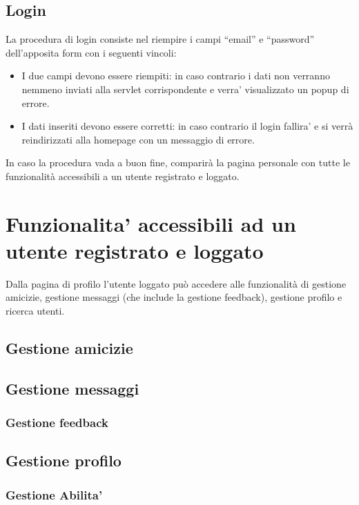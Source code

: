 \documentclass[a4paper,12pt]{article}
\begin{document}
\subsection{Login}
La procedura di login consiste nel riempire i campi ``email'' e ``password'' dell'apposita form con i seguenti vincoli:

\begin{itemize}
 \item I due campi devono essere riempiti: in caso contrario i dati non verranno nemmeno inviati alla servlet corrispondente e verra' visualizzato un popup di errore.
 \item I dati inseriti devono essere corretti: in caso contrario il login fallira' e si verrà reindirizzati alla homepage con un messaggio di errore.
\end{itemize}

In caso la procedura vada a buon fine, comparirà la pagina personale con tutte le funzionalità accessibili a un utente registrato e loggato.

\section{Funzionalita' accessibili ad un utente registrato e loggato}

Dalla pagina di profilo l'utente loggato può accedere alle funzionalità di gestione amicizie, gestione messaggi (che include la gestione feedback), gestione profilo e ricerca utenti.

\subsection{Gestione amicizie}

\subsection{Gestione messaggi}

\subsubsection{Gestione feedback}

\subsection{Gestione profilo}

\subsubsection{Gestione Abilita'}
\end{document}
